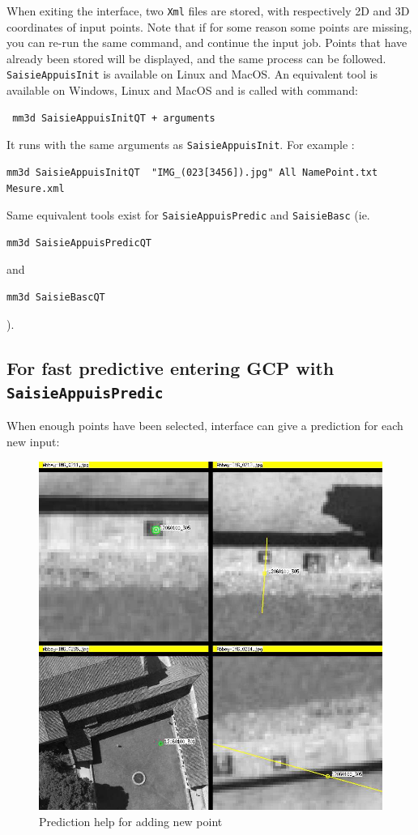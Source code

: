 When exiting the interface, two {\tt Xml} files are stored, with respectively 2D and 3D coordinates of input points.
Note that if for some reason some points are missing, you can re-run the same command, and continue the input job.
Points that have already been stored will be displayed, and the same process can be followed.\\

{\tt SaisieAppuisInit} is available on Linux and MacOS.
An equivalent tool is available on Windows, Linux and MacOS and is called with command: \begin{verbatim} mm3d SaisieAppuisInitQT + arguments \end{verbatim}
It runs with the same arguments as {\tt SaisieAppuisInit}. For example :
\begin{verbatim}
mm3d SaisieAppuisInitQT  "IMG_(023[3456]).jpg" All NamePoint.txt  Mesure.xml
\end{verbatim}

Same equivalent tools exist for {\tt SaisieAppuisPredic} and {\tt SaisieBasc} (ie. \begin{verbatim}mm3d SaisieAppuisPredicQT\end{verbatim} and \begin{verbatim}mm3d SaisieBascQT\end{verbatim}).


\subsection{For fast predictive entering GCP with {\tt SaisieAppuisPredic}}

When enough points have been selected, interface can give a prediction for each new input:

\begin{figure}[H]
\begin{center}
\includegraphics[width=120mm]{FIGS/Saisie/prediction.jpg}
\end{center}
\caption{Prediction help for adding new point}
\label{FIG:SaisieAppuis:prediction}
\end{figure}

